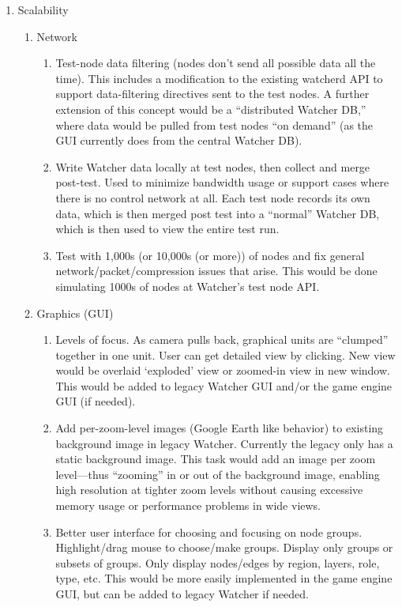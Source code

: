 \documentclass{report}
\begin{document}
\begin{enumerate}
\item Scalability 
\begin{enumerate}
    \item Network 
    \begin{enumerate}
        \item Test-node data filtering (nodes don't send all possible data all the time). This includes a modification to the existing watcherd API to support data-filtering directives sent to the test nodes.  A further extension of this concept would be a ``distributed Watcher DB,'' where data would be pulled from test nodes ``on demand'' (as the GUI currently does from the central Watcher DB).
        \item Write Watcher data locally at test nodes, then collect and merge post-test. Used to minimize bandwidth usage or support cases where there is no control network at all. Each test node records its own data, which is then merged post test into a ``normal'' Watcher DB, which is then used to view the entire test run.
         \item Test with 1,000s (or 10,000s (or more)) of nodes and fix general network\slash packet\slash compression issues that arise. This would be done simulating 1000s of nodes at Watcher's test node API. 
    \end{enumerate}
    \item Graphics (GUI) 
    \begin{enumerate}
        \item Levels of focus. As camera pulls back, graphical units are ``clumped'' together in one unit. User can get detailed view by clicking. New view would be overlaid `exploded' view or zoomed-in view in new window. This would be added to legacy Watcher GUI and/or the game engine GUI (if needed). 
        \item Add per-zoom-level images (Google Earth like behavior) to existing background image in legacy Watcher. Currently the legacy only has a static background image. This task would add an image per zoom level---thus ``zooming'' in or out of the background image, enabling high resolution at tighter zoom levels without causing excessive memory usage or performance problems in wide views. 
        \item Better user interface for choosing and focusing on node groups. Highlight\slash drag mouse to choose\slash make groups. Display only groups or subsets of groups. Only display nodes\slash edges by region, layers, role, type, etc. This would be more easily implemented in the game engine GUI, but can be added to legacy Watcher if needed.

\end{enumerate}
\end{enumerate}
\end{enumerate}
\end{document}
